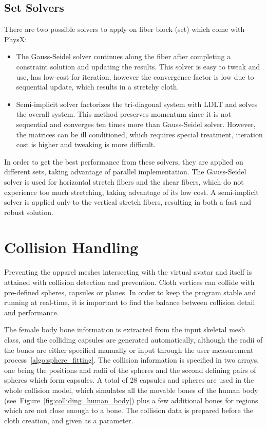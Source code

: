 \subsection{Set Solvers}
There are two possible solvers to apply on fiber block (set) which come with PhysX:
\begin{itemize}
\item The Gauss-Seidel solver continues along the fiber after completing a constraint solution and updating the results. This solver is easy to tweak and use, has low-cost for iteration, however the convergence factor is low due to sequential update, which results in a stretchy cloth.
\item Semi-implicit solver factorizes the tri-diagonal system with LDLT and solves the overall system. This method preserves momentum since it is not sequential and converges ten times more than Gauss-Seidel solver. However, the matrices can be ill conditioned, which requires special treatment, iteration cost is higher and tweaking is more difficult.
\end{itemize}

In order to get the best performance from these solvers, they are applied on different sets, taking advantage of parallel implementation. The Gauss-Seidel solver is used for horizontal stretch fibers and the shear fibers, which do not experience too much stretching, taking advantage of its low cost. A semi-implicit solver is applied only to the vertical stretch fibers, resulting in both a fast and robust solution.

\section{Collision Handling}
\label{section_chapter_collision}

Preventing the apparel meshes intersecting with the virtual avatar and itself is attained with collision detection and prevention. Cloth vertices can collide with pre-defined spheres, capsules or planes. In order to keep the program stable and running at real-time, it is important to find the balance between collision detail and performance. 

The female body bone information is extracted from the input skeletal mesh class, and the colliding capsules are generated automatically, although the radii of the bones are either specified manually or input through the user measurement process~\ref{algo:sphere_fitting}. The collision information is specified in two arrays, one being the positions and radii of the spheres and the second defining pairs of spheres which form capsules. A total of 28 capsules and spheres are used in the whole collision model, which simulates all the movable bones of the human body (see~Figure~\ref{fig:colliding_human_body}) plus a few additional bones for regions which are not close enough to a bone.  The collision data is prepared before the cloth creation, and given as a parameter. 

